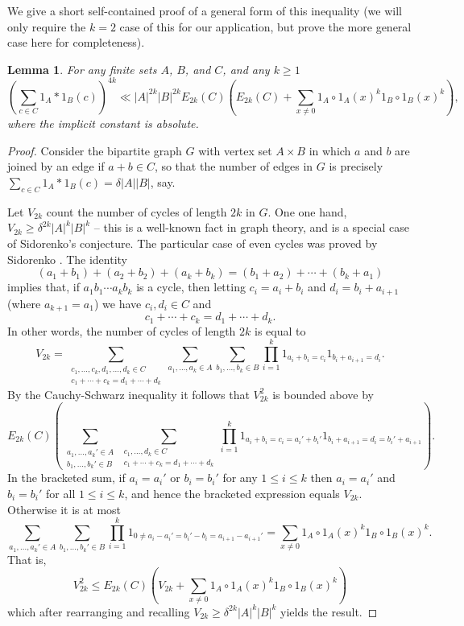 \documentclass{amsart}
\renewcommand{\leq}{\leqslant}
\renewcommand{\geq}{\geqslant}
\newcommand{\abs}[1]{\left\lvert #1\right\rvert}
\newcommand{\brac}[1]{\left( #1\right)}
\newtheorem{lemma}{Lemma}
\theoremstyle{definition}
\begin{document}
We give a short self-contained proof of a general form of this inequality (we will only require the $k=2$ case of this for our application, but prove the more general case here for completeness).
\begin{lemma}\label{lem-shkredov}
For any finite sets $A$, $B$, and $C$, and any $k\geq 1$
\[\brac{\sum_{c\in C}1_A\ast 1_B(c)}^{4k}\ll \abs{A}^{2k}\abs{B}^{2k}E_{2k}(C)\brac{E_{2k}(C)+\sum_{x\neq 0}1_A\circ 1_A(x)^{k}1_B\circ 1_B(x)^k},\]
where the implicit constant is absolute.
\end{lemma}
\begin{proof}
Consider the bipartite graph $G$ with vertex set $A\times B$ in which $a$ and $b$ are joined by an edge if $a+b\in C$, so that the number of edges in $G$ is precisely $\sum_{c\in C}1_A\ast 1_B(c)=\delta \abs{A}\abs{B}$, say.

Let $V_{2k}$ count the number of cycles of length $2k$ in $G$. One one hand, $V_{2k}\geq \delta^{2k}\abs{A}^k\abs{B}^k$ -- this is a well-known fact in graph theory, and is a special case of Sidorenko's conjecture. The particular case of even cycles was proved by Sidorenko \cite{Si91}. The identity
\[(a_1+b_1)+(a_2+b_2)+(a_k+b_k)=(b_1+a_2)+\cdots+(b_k+a_1)\]
implies that, if $a_1b_1\cdots a_kb_k$ is a cycle, then letting $c_i=a_i+b_i$ and $d_i=b_i+a_{i+1}$ (where $a_{k+1}=a_1$) we have $c_i,d_i\in C$ and
\[c_1+\cdots+c_k=d_1+\cdots+d_k.\]
In other words, the number of cycles of length $2k$ is equal to
\[V_{2k}=\sum_{\substack{c_1,\ldots,c_k,d_1,\ldots,d_k\in C\\ c_1+\cdots+c_k=d_1+\cdots+d_k}}\sum_{a_1,\ldots,a_k\in A}\sum_{b_1,\ldots,b_k\in B}\prod_{i=1}^k 1_{a_i+b_i=c_i}1_{b_i+a_{i+1}=d_i}.\]
By the Cauchy-Schwarz inequality it follows that $V_{2k}^2$ is bounded above by
\[E_{2k}(C)\brac{ \sum_{\substack{a_1,\ldots,a_k'\in A\\b_1,\ldots,b_k'\in B}}\sum_{\substack{c_1,\ldots,d_k\in C\\ c_1+\cdots+c_k=d_1+\cdots+d_k}} \prod_{i=1}^k 1_{a_i+b_i=c_i=a_i'+b_i'}1_{b_i+a_{i+1}=d_i=b_i'+a_{i+1}}}.\]
In the bracketed sum, if $a_i=a_i'$ or $b_i=b_i'$ for any $1\leq i\leq k$ then $a_i=a_i'$ and $b_i=b_i'$ for all $1\leq i\leq k$, and hence the bracketed expression equals $V_{2k}$. Otherwise it is at most
\[\sum_{a_1,\ldots,a_k'\in A}\sum_{b_1,\ldots,b_k'\in B} \prod_{i=1}^k  1_{0\neq a_i-a_i'=b_i'-b_i=a_{i+1}-a_{i+1}'}=\sum_{x\neq 0}1_A\circ 1_A(x)^k1_B\circ 1_B(x)^k.\]
That is,
\[V_{2k}^2\leq E_{2k}(C)\brac{V_{2k}+\sum_{x\neq 0}1_A\circ 1_A(x)^k1_B\circ 1_B(x)^k}\]
which after rearranging and recalling $V_{2k}\geq \delta^{2k}\abs{A}^k\abs{B}^k$ yields the result.
\end{proof}
\end{document}
